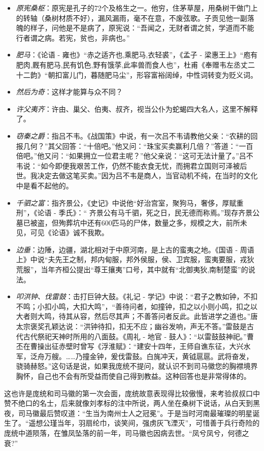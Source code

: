 \documentclass[]{book}
\begin{document}
\begin{itemize}
\item
  \emph{原宪桑枢}：原宪是孔子的72个及格生之一。他穷，住茅草屋，用桑树干做门上的转轴（桑树材质不好），漏风漏雨，毫不在意，不废弦歌。子贡见他一副落魄的样子，问他是不是病了，原宪说：``吾闻之，无财者谓之贫，学道而不能行者谓之病。若宪，贫也，非病也。''
\item
  \emph{肥马}：《论语 - 雍也》``赤之适齐也,乘肥马,衣轻裘''，《孟子 -
  梁惠王上》``庖有肥肉,厩有肥马,民有饥色,野有饿莩,此率兽而食人也''，杜甫《奉赠韦左丞丈二十二韵》``朝扣富儿门，暮随肥马尘''，形容富裕阔绰，中性词转变为贬义词。
\item
  \emph{然后为奇}：这样才能算与众不同？
\item
  \emph{许父夷齐}：许由、巢父、伯夷、叔齐，视当公仆为蛇蝎四大名人，这里不解释了。
\item
  \emph{窃秦之爵}：指吕不韦。《战国策》中说，有一次吕不韦请教他父亲：``农耕的回报几何？''其父回答：``十倍吧。''他又问：``珠宝买卖赢利几倍？''答道：``一百倍吧。''他又问：``如果拥立一位君主呢？''他父亲说：``这可无法计量了。''吕不韦说：``如今即便我艰苦工作，仍然不能衣食无忧，而拥君立国则可泽被后世。我决定去做这笔买卖。''因为吕不韦是商人，当官动机不纯，在当时的文化中是看不起他的。
\item
  \emph{千驷之富}：指齐景公，《史记》中说他``好治宫室，聚狗马，奢侈，厚赋重刑''，《论语
  - 季氏》：``
  齐景公有马千驷，死之日，民无德而称焉。''现存齐景公墓已被盗，但殉葬坑中还有600匹马的尸体，数量之多，规模之大，前所未见，可见《论语》诚不我欺。
\item
  \emph{边垂}：边陲，边疆，湖北相对于中原河南，是上古的蛮夷之地。《国语
  -
  周语上》中说``夫先王之制，邦内甸服，邦外侯服，侯、卫宾服，蛮夷要服，戎狄荒服''，当年齐桓公提出``尊王攘夷''口号，其中就有``北御夷狄,南制楚蛮''的说法。
\item
  \emph{叩洪钟、伐雷鼓}：击打巨钟大鼓。《礼记 -
  学记》中说：``君子之教如钟，不扣不鸣；小扣小鸣，大扣大鸣''，``善待问者，如撞钟，扣之以小则小鸣，扣之以大者则大鸣，待其从容，然后尽其声；不善答问者反此。此皆进学之道也。''唐太宗褒奖孔颖达说：``洪钟待扣，扣无不应；幽谷发响，声无不答。''雷鼓是古代古代祭祀天神时所用的八面鼓。《周礼
  - 地官 -
  鼓人》：``以雷鼓鼓神祀。''曹丕在曹操出征赤壁时曾写《浮淮赋》：``建安十四年，王师自谯东征，大兴水军，泛舟万艘。\ldots{}\ldots{}乃撞金钟，爰伐雷鼓。白旄冲天，黄钺扈扈。武将奋发，骁骑赫怒。''这句话是说，如果我庞统不提问，就认识不到司马徽您的胸襟境界胸怀，自己也不会有所受益而使自己得到教益。这种回答也是非常得体的。
\end{itemize}

这也许是庞统和司马徽的第一次会面，庞统故意表现得比较傲慢，来考验叔叔口中赞不绝口的名士，后来就像刘孝标的注中所说，两人坐在桑树下说话，从白天到黑夜，司马徽最后赞叹道：``生当为南州士人之冠冕''。于是当时河南最璀璨的明星诞生了。``遥想公瑾当年，羽扇纶巾，谈笑间，强虏灰飞湮灭''，可惜善于兵行奇险的庞统中道陨落，在雏凤坠落的前一年，司马徽也因病去世。``凤兮凤兮，何德之衰?''
\end{document}

